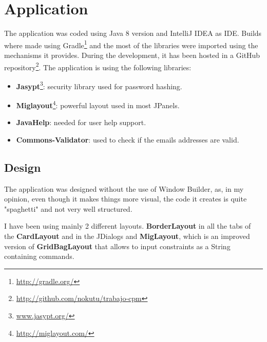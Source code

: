 \documentclass[11pt]{article}
\begin{document}
	\section{Application}
	The application was coded using Java 8 version and IntelliJ IDEA as IDE. Builds where made using Gradle\footnote{\url{http://gradle.org/}} and the most of the libraries were imported using the mechanisms it provides. During the development, it has been hosted in a GitHub repository\footnote{\url{http://github.com/nokutu/trabajo-cpm}}. The application is using the following libraries:
	\begin{itemize}
	   	\item \textbf{Jasypt}\footnote{\url{www.jasypt.org/}}: security library used for password hashing.
	   	\item \textbf{Miglayout}\footnote{\url{http://miglayout.com/}}: powerful layout used in most JPanels.
	   	\item \textbf{JavaHelp}: needed for user help support.
	   	\item \textbf{Commons-Validator}: used to check if the emails addresses are valid.
	\end{itemize}
	\subsection{Design}
	The application was designed without the use of Window Builder, as, in my opinion, even though it makes things more visual, the code it creates is quite "spaghetti" and not very well structured.
   
	I have been using mainly 2 different layouts. \textbf{BorderLayout} in all the tabs of the \textbf{CardLayout} and in the JDialogs and \textbf{MigLayout}, which is an improved  version of \textbf{GridBagLayout} that allows to input constraints as a String containing commands.
   
\end{document}
